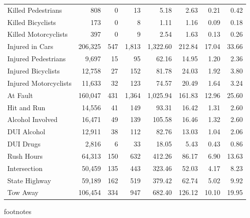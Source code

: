 \begin{table}[h]
\begin{tabular}{lrrrrrrr}
  Killed Pedestrians & 808 &   0 &  13 & 5.18 & 2.63 & 0.21 & 0.42 \\ 
  Killed Bicyclists & 173 &   0 &   8 & 1.11 & 1.16 & 0.09 & 0.18 \\ 
  Killed Motorcyclists & 397 &   0 &   9 & 2.54 & 1.63 & 0.13 & 0.26 \\ 
  Injured in Cars & 206,325 & 547 & 1,813 & 1,322.60 & 212.84 & 17.04 & 33.66 \\ 
  Injured Pedestrians & 9,697 &  15 &  95 & 62.16 & 14.95 & 1.20 & 2.36 \\ 
  Injured Bicyclists & 12,758 &  27 & 152 & 81.78 & 24.03 & 1.92 & 3.80 \\ 
  Injured Motorcyclists & 11,633 &  32 & 123 & 74.57 & 20.49 & 1.64 & 3.24 \\ 
   \midrule 
At Fault & 160,047 & 431 & 1,364 & 1,025.94 & 161.83 & 12.96 & 25.60 \\ 
  Hit and Run & 14,556 &  41 & 149 & 93.31 & 16.42 & 1.31 & 2.60 \\ 
  Alcohol Involved & 16,471 &  49 & 139 & 105.58 & 16.46 & 1.32 & 2.60 \\ 
  DUI Alcohol & 12,911 &  38 & 112 & 82.76 & 13.03 & 1.04 & 2.06 \\ 
  DUI Drugs & 2,816 &   6 &  33 & 18.05 & 5.43 & 0.43 & 0.86 \\ 
   \midrule 
Rush Hours & 64,313 & 150 & 632 & 412.26 & 86.17 & 6.90 & 13.63 \\ 
  Intersection & 50,459 & 135 & 443 & 323.46 & 52.03 & 4.17 & 8.23 \\ 
  State Highway & 59,189 & 162 & 519 & 379.42 & 62.74 & 5.02 & 9.92 \\ 
  Tow Away & 106,454 & 334 & 947 & 682.40 & 126.12 & 10.10 & 19.95 \\ 
   \bottomrule
\end{tabular}
\end{table}
footnotes \\ 
  \midrule
{} \\ 
   \\ 
   \bottomrule
